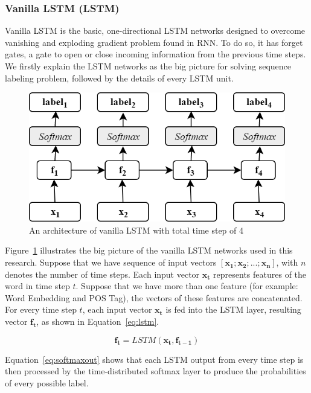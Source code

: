 \subsubsection{Vanilla LSTM (LSTM)}
Vanilla LSTM is the basic, one-directional LSTM networks designed to overcome vanishing and exploding gradient problem found in RNN. To do so, it has forget gates, a gate to open or close incoming information from the previous time steps. We firstly explain the LSTM networks as the big picture for solving sequence labeling problem, followed by the details of every LSTM unit. 

\begin{figure}
	\centering
	\includegraphics[width=0.75\linewidth]{images/olstm}
	\caption{An architecture of vanilla LSTM with total time step of 4}
	\label{fig:olstm}
\end{figure}

Figure~\ref{fig:olstm} illustrates the big picture of the vanilla LSTM networks used in this research. Suppose that we have sequence of input vectors $[\mathbf{x_{1}}; \mathbf{x_{2}}; ...; \mathbf{x_{n}}]$, with $n$ denotes the number of time steps. Each input vector $\mathbf{x_{t}}$ represents features of the word in time step $t$. Suppose that we have more than one feature (for example: Word Embedding and POS Tag), the vectors of these features are concatenated. For every time step $t$, each input vector $\mathbf{x_{t}}$ is fed into the LSTM layer, resulting vector $\mathbf{f_{t}}$, as shown in Equation~\ref{eq:lstm}. 

\begin{equation}
\label{eq:lstm}
\mathbf{f_{t}} = LSTM(\mathbf{x_{t}}, \mathbf{f_{t-1}})
\end{equation}

Equation~\ref{eq:softmaxout} shows that each LSTM output from every time step is then processed by the time-distributed softmax layer to produce the probabilities of every possible label.

